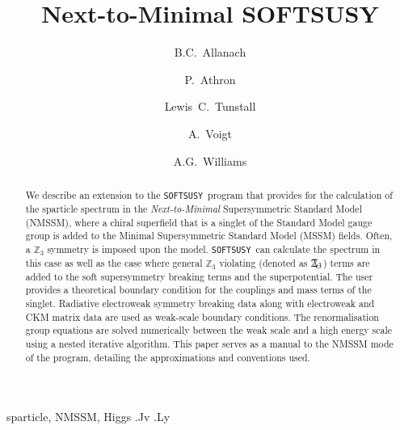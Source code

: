 \documentclass[final,3p,times,pdflatex]{elsarticle}
\def\SOFTSUSY{{\tt SOFTSUSY}}
\newcommand{\Zv}{\,\mathbf{\backslash}\mkern-11.0mu{\mathbb{Z}}_{3}} %
\begin{document}
\begin{frontmatter}

\title{Next-to-Minimal SOFTSUSY}

\author[damtp]{B.C.~Allanach}
\author[adelaide]{P.~Athron}
\author[adelaide,bern]{Lewis~C.~Tunstall}
\author[dresden]{A.~Voigt}
\author[adelaide]{A.G.~Williams}
\address[damtp]{DAMTP, CMS, University of Cambridge, Wilberforce road, Cambridge, CB3
  0WA, United Kingdom}
\address[adelaide]{ARC Centre of Excellence for Particle Physics at 
the Tera-scale, School of Chemistry and Physics, University of Adelaide, 
Adelaide SA 5005 Australia}
\address[bern]{Albert Einstein Center for Fundamental Physics, Institute for Theoretical Physics, University of Bern, Sidlerstrasse 5, CH-3012 Bern, Switzerland}
\address[dresden]{Institut f\"ur Kern- und Teilchenphysik,
TU Dresden, Zellescher Weg 19, 01069 Dresden, Germany}

\begin{abstract}
  We describe an extension to the
  \SOFTSUSY~program that provides for the calculation of the sparticle spectrum in the
  {\em Next-to-Minimal} Supersymmetric Standard Model (NMSSM), where a chiral
  superfield that is a singlet of the Standard Model gauge group is added to
  the Minimal Supersymmetric Standard Model (MSSM) fields. Often, a $\mathbb{Z}_3$
  symmetry is 
  imposed upon the model. \SOFTSUSY~can calculate the spectrum in this
  case as well as the case where general $\mathbb{Z}_3$ violating (denoted as $\Zv$) terms are
  added to 
  the soft supersymmetry breaking terms and the superpotential. 
  The user provides a theoretical boundary condition for the couplings and
  mass terms of the singlet.
  Radiative electroweak symmetry breaking data along with
  electroweak and CKM matrix data are used
  as weak-scale boundary conditions. 
  The renormalisation group equations are solved
  numerically between the weak scale and a high energy scale using a nested
  iterative algorithm. 
  This paper serves as a manual to the
  NMSSM mode of the program, detailing the approximations and
  conventions used. 
\end{abstract}

\begin{keyword}
sparticle, 
NMSSM, Higgs
.Jv
.Ly
\end{keyword}
\end{frontmatter}
\end{document}
